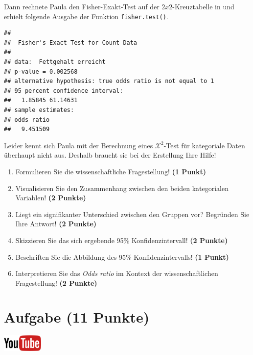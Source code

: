 \documentclass[a4paper, 9pt]{scrartcl}\usepackage[]{graphicx}\usepackage[]{xcolor}
\makeatletter
\newenvironment{kframe}{%
 \def\at@end@of@kframe{}%
 \ifinner\ifhmode%
  \def\at@end@of@kframe{\end{minipage}}%
  \begin{minipage}{\columnwidth}%
 \fi\fi%
 \def\FrameCommand##1{\hskip\@totalleftmargin \hskip-\fboxsep
 \colorbox{shadecolor}{##1}\hskip-\fboxsep
     \hskip-\linewidth \hskip-\@totalleftmargin \hskip\columnwidth}%
 \MakeFramed {\advance\hsize-\width
   \@totalleftmargin\z@ \linewidth\hsize
   \@setminipage}}%
 {\par\unskip\endMakeFramed%
 \at@end@of@kframe}
\newenvironment{knitrout}{}{} %
\makeatother
\begin{document}
Dann rechnete Paula den Fisher-Exakt-Test auf der $2x2$-Kreuztabelle in \Rlogo und erhielt folgende \Rlogo Ausgabe der Funktion \texttt{fisher.test()}.

\begin{knitrout}
\color{fgcolor}\begin{kframe}
\begin{verbatim}
## 
## 	Fisher's Exact Test for Count Data
## 
## data:  Fettgehalt erreicht
## p-value = 0.002568
## alternative hypothesis: true odds ratio is not equal to 1
## 95 percent confidence interval:
##   1.85845 61.14631
## sample estimates:
## odds ratio 
##   9.451509
\end{verbatim}
\end{kframe}
\end{knitrout}

Leider kennt sich Paula mit der Berechnung eines $\mathcal{X}^2$-Test für kategoriale Daten überhaupt nicht aus. Deshalb braucht sie bei der Erstellung Ihre Hilfe!

\begin{enumerate}
\item Formulieren Sie die wissenschaftliche Fragestellung! \textbf{(1 Punkt)}
\item Visualisieren Sie den Zusammenhang zwischen den beiden kategorialen Variablen! \textbf{(2 Punkte)}
\item Liegt ein signifikanter Unterschied zwischen den Gruppen vor? Begründen Sie Ihre Antwort! \textbf{(2 Punkte)}
\item Skizzieren Sie das sich ergebende 95\% Konfidenzintervall! \textbf{(2 Punkte)}
\item Beschriften Sie die Abbildung des 95\% Konfidenzintervalls! \textbf{(1 Punkt)} 
\item Interpretieren Sie das \textit{Odds ratio} im Kontext der wissenschaftlichen Fragestellung! \textbf{(2 Punkte)} 
\end{enumerate}
 
\clearpage

\section{Aufgabe \hfill (11 Punkte)}

\hfill\href{https://youtu.be/VQlNl8hvRII}{\includegraphics[width =
  2cm]{img/youtube}}\\[1Ex]
\end{document}
